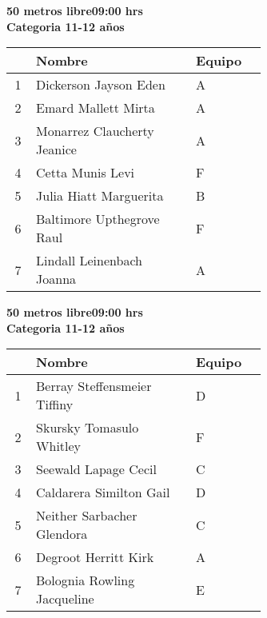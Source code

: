 \begin{minipage}{0.95\linewidth}\vspace{0.5cm} 
\begin{flushleft}
\textbf{
\hspace{-0.15cm}50 metros libre\hspace{1.5cm}09:00 hrs \\Categoria 11-12 años}\vspace{-0.2cm} 
\end{flushleft}
\begin{tabular}{cp{0.63\linewidth}l}
\hline
& \textbf{Nombre} & \textbf{Equipo} \\ \hline
1 & Dickerson Jayson Eden & A \\ 
2 & Emard Mallett Mirta & A \\ 
3 & Monarrez Claucherty Jeanice & A \\ 
4 & Cetta Munis Levi & F \\ 
5 & Julia Hiatt Marguerita & B \\ 
6 & Baltimore Upthegrove Raul & F \\ 
7 & Lindall Leinenbach Joanna & A \\ 
\end{tabular}
\end{minipage}
\begin{minipage}{0.95\linewidth}\vspace{0.5cm} 
\begin{flushleft}
\textbf{
\hspace{-0.15cm}50 metros libre\hspace{1.5cm}09:00 hrs \\Categoria 11-12 años}\vspace{-0.2cm} 
\end{flushleft}
\begin{tabular}{cp{0.63\linewidth}l}
\hline
& \textbf{Nombre} & \textbf{Equipo} \\ \hline
1 & Berray Steffensmeier Tiffiny & D \\ 
2 & Skursky Tomasulo Whitley & F \\ 
3 & Seewald Lapage Cecil & C \\ 
4 & Caldarera Similton Gail & D \\ 
5 & Neither Sarbacher Glendora & C \\ 
6 & Degroot Herritt Kirk & A \\ 
7 & Bolognia Rowling Jacqueline & E \\ 
\end{tabular}
\end{minipage}
